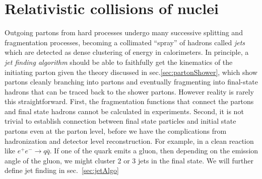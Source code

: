 \chapter{Relativistic collisions of  nuclei}
\label{ch:hic}
Outgoing partons from hard processes undergo many successive splitting and fragmentation processes, becoming a collimated ``spray'' of hadrons called \emph{jets} which are detected as dense clustering of energy in calorimeters. 
%
In principle, a \emph{jet finding algorithm} should be able to faithfully get the kinematics of the initiating parton given the theory discussed in sec.\ref{sec:partonShower}, which show partons cleanly branching into partons and eventually fragmenting into final-state hadrons that can be traced back to the shower partons. 
%
However reality is rarely this straightforward. 
%
First, the fragmentation functions that connect the partons and final state hadrons cannot be calculated in experiments. 
%
Second, it is not trivial to establish connection between final state particles and initial state partons even at the parton level, before we have the complications from hadronization and detector level reconstruction. 
%
For example, in a clean reaction like \(e^+e^-\to q\bar{q}\). If one of the quark emits a gluon, then depending on the emission angle of the gluon, we might cluster 2 or 3 jets in the final state. We will further define jet finding in sec.~\ref{sec:jetAlgo}


